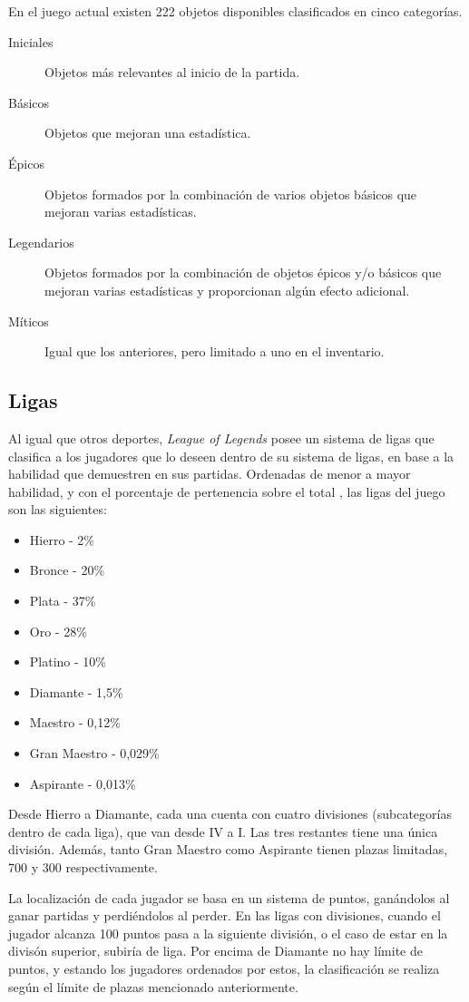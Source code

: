 En el juego actual existen 222 objetos disponibles clasificados en cinco categorías.
\begin{description}
	\item[Iniciales] Objetos más relevantes al inicio de la partida.
	\item[Básicos] Objetos que mejoran una estadística.
	\item[Épicos] Objetos formados por la combinación de varios objetos básicos que mejoran varias estadísticas.
	\item[Legendarios] Objetos formados por la combinación de objetos épicos y/o básicos que mejoran varias estadísticas y proporcionan algún efecto adicional.
	\item[Míticos] Igual que los anteriores, pero limitado a uno en el inventario.
\end{description}

\subsection{Ligas}
Al igual que otros deportes, \textit{League of Legends} posee un sistema de ligas que clasifica a los jugadores que lo deseen dentro de su sistema de ligas, en base a la habilidad que demuestren en sus partidas. Ordenadas de menor a mayor habilidad, y con el porcentaje de pertenencia sobre el total \cite{misc:player-distribution}, las ligas del juego son las siguientes:
\begin{itemize}
	\tightlist
	\item Hierro - 2\%
	\item Bronce - 20\%
	\item Plata - 37\%
	\item Oro - 28\%
	\item Platino - 10\%
	\item Diamante - 1,5\%
	\item Maestro - 0,12\%
	\item Gran Maestro - 0,029\%
	\item Aspirante - 0,013\%
\end{itemize}
Desde Hierro a Diamante, cada una cuenta con cuatro divisiones (subcategorías dentro de cada liga), que van desde IV a I. Las tres restantes tiene una única división. Además, tanto Gran Maestro como Aspirante tienen plazas limitadas, 700 y 300 respectivamente.

La localización de cada jugador se basa en un sistema de puntos, ganándolos al ganar partidas y perdiéndolos al perder. En las ligas con divisiones, cuando el jugador alcanza 100 puntos pasa a la siguiente división, o el caso de estar en la divisón superior, subiría de liga. Por encima de Diamante no hay límite de puntos, y estando los jugadores ordenados por estos, la clasificación se realiza según el límite de plazas mencionado anteriormente.
 

